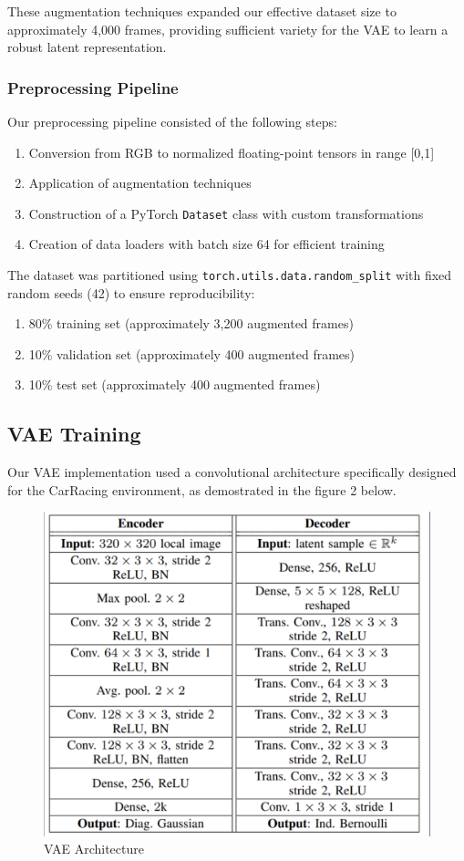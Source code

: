 \documentclass[conference]{IEEEtran}
\begin{document}
These augmentation techniques expanded our effective dataset size to approximately 4,000 frames, providing sufficient variety for the VAE to learn a robust latent representation.

\subsubsection{Preprocessing Pipeline}
Our preprocessing pipeline consisted of the following steps:
\begin{enumerate}[label=\roman*.]
    \item Conversion from RGB to normalized floating-point tensors in range [0,1]
    \item Application of augmentation techniques
    \item Construction of a PyTorch \texttt{Dataset} class with custom transformations
    \item Creation of data loaders with batch size 64 for efficient training
\end{enumerate}

The dataset was partitioned using \texttt{torch.utils.data.random\_split} with fixed random seeds (42) to ensure reproducibility:
\begin{enumerate}[label=\roman*.]
    \item 80\% training set (approximately 3,200 augmented frames)
    \item 10\% validation set (approximately 400 augmented frames)
    \item 10\% test set (approximately 400 augmented frames)
\end{enumerate}

\subsection{VAE Training}

Our VAE implementation used a convolutional architecture specifically designed for the CarRacing environment, as demostrated in the figure 2 below.
\begin{figure}[H]
    \centering
    \includegraphics[width=0.75\linewidth]{Writeup/vae-arch.png}
    \caption{VAE Architecture}
    \label{fig:enter-label}
\end{figure}
\end{document}
